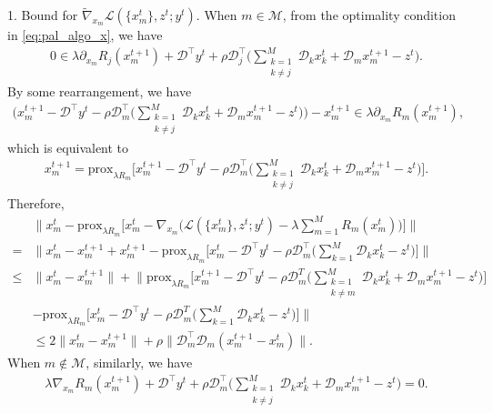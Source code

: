 1. Bound for $\tilde{\nabla}_{x_m} \mathcal{L}(\{x_m^t\}, z^t; y^t)$. When $m\in\mathcal{M}$, from the optimality condition in \eqref{eq:pal_algo_x}, we have
\begin{align}
    0 \in \lambda\partial_{x_m}R_j(x_m^{t+1}) + \mathcal{D}^\top y^t + \rho \mathcal{D}_j^\top \big(\sum_{\substack{k=1\\k\neq j}}^M \mathcal{D}_kx_k^{t} + \mathcal{D}_mx_m^{t+1} - z^{t}\big).\nonumber
\end{align}
By some rearrangement, we have
\begin{align}
    \big(x_m^{t+1} - \mathcal{D}^\top y^t - \rho \mathcal{D}_m^\top \big(\sum_{\substack{k=1\\k\neq j}}^M \mathcal{D}_kx_k^{t}+ \mathcal{D}_mx_m^{t+1} - z^{t}\big)\big) - x_m^{t+1} \in \lambda\partial_{x_m}R_m(x_m^{t+1}),\nonumber
\end{align}
which is equivalent to
\begin{align}
    x_m^{t+1} = \text{prox}_{\lambda R_m}\big[x_m^{t+1} - \mathcal{D}^\top y^t - \rho \mathcal{D}_m^\top\big(\sum_{\substack{k=1\\k\neq j}}^M \mathcal{D}_kx_k^{t}+ \mathcal{D}_mx_m^{t+1} - z^{t}\big)\big].
\end{align}
Therefore,
\begin{align}
    & \|x_m^t - \text{prox}_{\lambda R_m} \big[x_m^t-\nabla_{x_m}\big(\mathcal{L}(\{x^t_m\}, z^t; y^t) - \lambda\sum_{m=1}^{M} R_m(x_m^t)\big)\big]\|\nonumber\\
    = & \big\|x_m^t - x_m^{t+1} + x_m^{t+1} - \text{prox}_{\lambda R_m}\big[x_m^{t} - \mathcal{D}^\top y^t - \rho \mathcal{D}_m^\top \big(\sum_{k=1}^M \mathcal{D}_kx_k^{t} - z^{t}\big)\big]\big\|\nonumber\\
    \le & \|x_m^t - x_m^{t+1}\| + \big\|  \text{prox}_{\lambda R_m}\big[x_m^{t+1} - \mathcal{D}^\top y^t - \rho \mathcal{D}_m^T\big( \sum_{\substack{k=1\\k\neq m}}^M \mathcal{D}_kx_k^{t}+ \mathcal{D}_mx_m^{t+1} - z^{t}\big)\big]\nonumber\\
    &  - \text{prox}_{\lambda R_m}\big[x_m^{t} - \mathcal{D}^\top y^t - \rho \mathcal{D}_m^T\big(\sum_{k=1}^M \mathcal{D}_kx_k^{t} - z^{t}\big)\big]\big\|\nonumber\\
    & \le 2\|x_m^t - x_m^{t+1}\| + \rho\|\mathcal{D}_m^\top \mathcal{D}_m(x_m^{t+1} - x_m^t)\|. \label{eq:proof_pal_bound_V_1}
\end{align}
When $m\not\in\mathcal{M}$, similarly, we have
\begin{align}
    \lambda\nabla_{x_m}R_m(x_m^{t+1}) + \mathcal{D}^\top y^t + \rho \mathcal{D}_m^\top \big(\sum_{\substack{k=1\\k\neq j}}^M \mathcal{D}_kx_k^{t}+ \mathcal{D}_mx_m^{t+1} - z^{t}\big) = 0.
\end{align}

